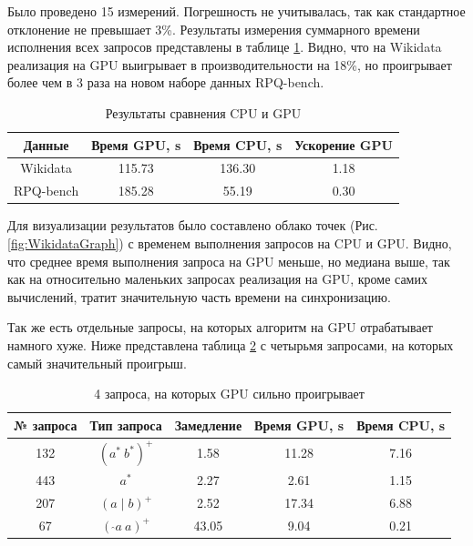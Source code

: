 Было проведено 15 измерений. Погрешность не учитывалась, так как стандартное отклонение не превышает 3\%.
Результаты измерения суммарного времени исполнения всех запросов представлены в таблице \ref{tab:ExpResults}.
Видно, что на Wikidata реализация на GPU выигрывает в производительности на 18\%, но проигрывает более чем в 3 раза на новом наборе данных RPQ-bench.

\begin{table}
    \centering
    \begin{tabular}{|c|c|c|c|}
\hline
Данные & Время GPU, \si{\second} & Время CPU, \si{\second} & Ускорение GPU \\
\hline
Wikidata & 115.73 & 136.30 & 1.18 \\
\hline
RPQ-bench & 185.28 & 55.19 & 0.30 \\
\hline
    \end{tabular}
    \caption{Результаты сравнения CPU и GPU}
    \label{tab:ExpResults}
\end{table}

Для визуализации результатов было составлено облако точек (Рис. \ref{fig:WikidataGraph}) с временем выполнения запросов на CPU и GPU. Видно, что среднее время выполнения запроса на GPU меньше, но медиана выше, так как на относительно маленьких запросах реализация на GPU, кроме самих вычислений, тратит значительную часть времени на синхронизацию.

Так же есть отдельные запросы, на которых алгоритм на GPU отрабатывает намного хуже. Ниже представлена таблица \ref{tab:worst4queris} с четырьмя запросами, на которых самый значительный проигрыш. 

\begin{table}[ht]
\centering
\caption{4 запроса, на которых GPU сильно проигрывает}
\label{tab:worst4queris}
\begin{tabular}{|c|c|c|c|c|}
\hline
№ запроса & Тип запроса & {Замедление} & {Время GPU, \si{\second}} & {Время CPU, \si{\second}} \\
\hline
132  & $(a^*~b^*)^+$ & 1.58   & 11.28  & 7.16  \\
\hline
443  & $a^*$ & 2.27   & 2.61   & 1.15  \\
\hline
207  & $(a\mid b)^+$ & 2.52   & 17.34  & 6.88  \\
\hline
67   & $(~\hat{}a~a)^+$ & 43.05  & 9.04   & 0.21  \\
\hline
\end{tabular}
\end{table}

